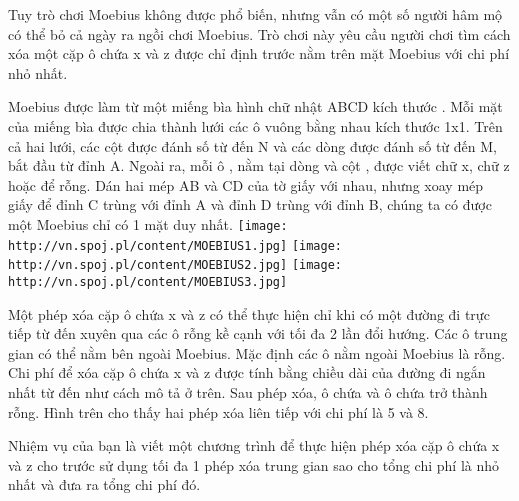 Tuy trò chơi Moebius không được phổ biến, nhưng vẫn có một số người hâm mộ có thể bỏ cả ngày ra ngồi chơi Moebius. Trò chơi này yêu cầu người chơi tìm cách xóa một cặp ô chứa x và z được chỉ định trước nằm trên mặt Moebius với chi phí nhỏ nhất.  

   Moebius được làm từ một miếng bìa hình chữ nhật ABCD kích thước  . Mỗi mặt của miếng bìa được chia thành lưới các ô vuông bằng nhau kích thước 1x1. Trên cả hai lưới, các cột được đánh số từ   đến N và các dòng được đánh số từ   đến M, bắt đầu từ đỉnh A. Ngoài ra, mỗi ô  , nằm tại dòng   và cột  , được viết chữ x, chữ z hoặc để rỗng. Dán hai mép AB và CD của tờ giấy với nhau, nhưng xoay mép giấy để đỉnh C trùng với đỉnh A và đỉnh D trùng với đỉnh B, chúng ta có được một Moebius chỉ có 1 mặt duy nhất.  
\texttt{[image: http://vn.spoj.pl/content/MOEBIUS1.jpg]}
\texttt{[image: http://vn.spoj.pl/content/MOEBIUS2.jpg]}
\texttt{[image: http://vn.spoj.pl/content/MOEBIUS3.jpg]}

   Một phép xóa cặp ô chứa x và z có thể thực hiện chỉ khi có một đường đi trực tiếp từ   đến   xuyên qua các ô rỗng kề cạnh với tối đa 2 lần đổi hướng. Các ô trung gian có thể nằm bên ngoài Moebius. Mặc định các ô nằm ngoài Moebius là rỗng. Chi phí để xóa cặp ô chứa x và z được tính bằng chiều dài của đường đi ngắn nhất từ   đến   như cách mô tả ở trên. Sau phép xóa, ô chứa   và ô chứa   trở thành rỗng. Hình trên cho thấy hai phép xóa liên tiếp với chi phí là 5 và 8.  

   Nhiệm vụ của bạn là viết một chương trình để thực hiện phép xóa cặp ô chứa x và z cho trước sử dụng tối đa 1 phép xóa trung gian sao cho tổng chi phí là nhỏ nhất và đưa ra tổng chi phí đó.